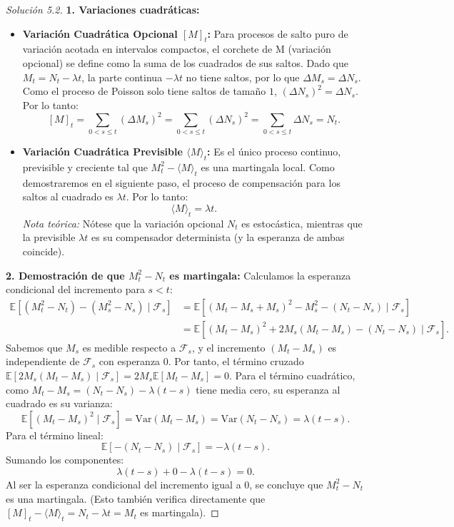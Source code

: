 \documentclass[10pt,a4paper]{article}
\begin{document}
\begin{proof}[Solución 5.2]
    \textbf{1. Variaciones cuadráticas:}
    \begin{itemize}
        \item \textbf{Variación Cuadrática Opcional $[M]_t$:} Para procesos de salto puro de variación acotada en intervalos compactos, el corchete de M (variación opcional) se define como la suma de los cuadrados de sus saltos. 
        Dado que $M_t = N_t - \lambda t$, la parte continua $-\lambda t$ no tiene saltos, por lo que $\Delta M_s = \Delta N_s$. Como el proceso de Poisson solo tiene saltos de tamaño $1$, $(\Delta N_s)^2 = \Delta N_s$.
        Por lo tanto:
        \[ [M]_t = \sum_{0 < s \le t} (\Delta M_s)^2 = \sum_{0 < s \le t} (\Delta N_s)^2 = \sum_{0 < s \le t} \Delta N_s = N_t. \]
        
        \item \textbf{Variación Cuadrática Previsible $\langle M \rangle_t$:} Es el único proceso continuo, previsible y creciente tal que $M_t^2 - \langle M \rangle_t$ es una martingala local. Como demostraremos en el siguiente paso, el proceso de compensación para los saltos al cuadrado es $\lambda t$.
        Por lo tanto:
        \[ \langle M \rangle_t = \lambda t. \]
        \textit{Nota teórica:} Nótese que la variación opcional $N_t$ es estocástica, mientras que la previsible $\lambda t$ es su compensador determinista (y la esperanza de ambas coincide).
    \end{itemize}

    \textbf{2. Demostración de que $M_t^2 - N_t$ es martingala:}
    Calculamos la esperanza condicional del incremento para $s < t$:
    \begin{align*}
        \mathbb{E}[(M_t^2 - N_t) - (M_s^2 - N_s) \mid \mathcal{F}_s] &= \mathbb{E}[(M_t - M_s + M_s)^2 - M_s^2 - (N_t - N_s) \mid \mathcal{F}_s] \\
        &= \mathbb{E}[(M_t - M_s)^2 + 2M_s(M_t - M_s) - (N_t - N_s) \mid \mathcal{F}_s].
    \end{align*}
    Sabemos que $M_s$ es medible respecto a $\mathcal{F}_s$, y el incremento $(M_t - M_s)$ es independiente de $\mathcal{F}_s$ con esperanza $0$. Por tanto, el término cruzado $\mathbb{E}[2M_s(M_t-M_s) \mid \mathcal{F}_s] = 2M_s \mathbb{E}[M_t-M_s] = 0$.
    Para el término cuadrático, como $M_t - M_s = (N_t - N_s) - \lambda(t-s)$ tiene media cero, su esperanza al cuadrado es su varianza:
    \[ \mathbb{E}[(M_t - M_s)^2 \mid \mathcal{F}_s] = \text{Var}(M_t - M_s) = \text{Var}(N_t - N_s) = \lambda(t-s). \]
    Para el término lineal:
    \[ \mathbb{E}[-(N_t - N_s) \mid \mathcal{F}_s] = -\lambda(t-s). \]
    Sumando los componentes:
    \[ \lambda(t-s) + 0 - \lambda(t-s) = 0. \]
    Al ser la esperanza condicional del incremento igual a $0$, se concluye que $M_t^2 - N_t$ es una martingala. (Esto también verifica directamente que $[M]_t - \langle M \rangle_t = N_t - \lambda t = M_t$ es martingala).


\end{proof}
\end{document}
